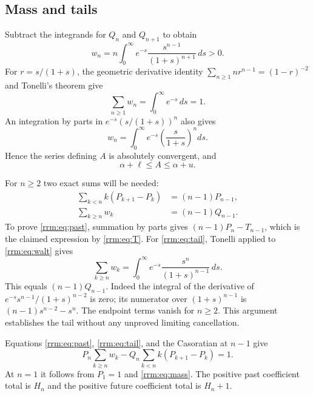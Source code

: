 \documentclass[11pt]{article}
\theoremstyle{remark}\newtheorem{remark}[theorem]{Remark}
\begin{document}
\subsection{Mass and tails}
Subtract the integrands for $Q_n$ and $Q_{n+1}$ to obtain
\begin{equation}\label{rrm:eq:wint}
 w_n=n\int_0^\infty e^{-s}\frac{s^{n-1}}{(1+s)^{n+1}}\,ds>0.
\end{equation}
For $r=s/(1+s)$, the geometric derivative identity
$\sum_{n\ge1}nr^{n-1}=(1-r)^{-2}$ and Tonelli's theorem give
\begin{equation}\label{rrm:eq:mass}
 \sum_{n\ge1}w_n=\int_0^\infty e^{-s}\,ds=1.
\end{equation}
An integration by parts in $e^{-s}(s/(1+s))^n$ also gives
\begin{equation}\label{rrm:eq:walt}
 w_n=\int_0^\infty e^{-s}\left(\frac{s}{1+s}\right)^n ds.
\end{equation}
Hence the series defining $A$ is absolutely convergent, and
\begin{equation}\label{rrm:eq:roughA}
 \alpha+\ell\le A\le\alpha+u.
\end{equation}

For $n\ge2$ two exact sums will be needed:
\begin{align}
 \sum_{k<n}k(P_{k+1}-P_k)&=(n-1)P_{n-1},\label{rrm:eq:past}\\
 \sum_{k\ge n}w_k&=(n-1)Q_{n-1}.\label{rrm:eq:tail}
\end{align}
To prove \eqref{rrm:eq:past}, summation by parts gives $(n-1)P_n-T_{n-1}$, which is the claimed expression by \eqref{rrm:eq:T}. For \eqref{rrm:eq:tail}, Tonelli applied to \eqref{rrm:eq:walt} gives
\[
 \sum_{k\ge n}w_k
 =\int_0^\infty e^{-s}\frac{s^n}{(1+s)^{n-1}}\,ds.
\]
This equals $(n-1)Q_{n-1}$. Indeed the integral of the derivative of
$e^{-s}s^{n-1}/(1+s)^{n-2}$ is zero; its numerator over $(1+s)^{n-1}$ is
$(n-1)s^{n-2}-s^n$. The endpoint terms vanish for $n\ge2$. This argument establishes the tail without any unproved limiting cancellation.

Equations \eqref{rrm:eq:past}, \eqref{rrm:eq:tail}, and the Casoratian at $n-1$ give
\begin{equation}\label{rrm:eq:massdiff}
 P_n\sum_{k\ge n}w_k-Q_n\sum_{k<n}k(P_{k+1}-P_k)=1.
\end{equation}
At $n=1$ it follows from $P_1=1$ and \eqref{rrm:eq:mass}. The positive past coefficient total is $H_n$ and the positive future coefficient total is $H_n+1$.
\end{document}
